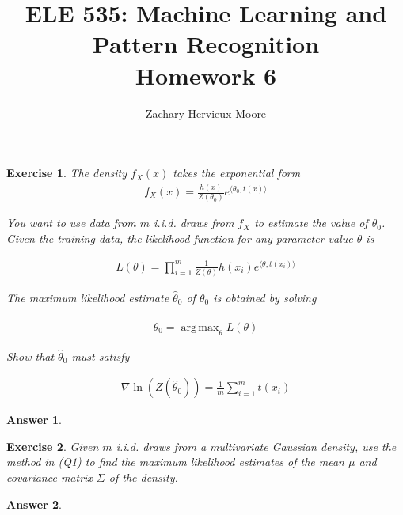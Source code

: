 \documentclass[12pt]{article}
\title{ELE 535: Machine Learning and Pattern Recognition \\ Homework 6}
\author{Zachary Hervieux-Moore}
\date{\displaydate{date}}
\DeclareMathOperator*{\argmax}{arg\,max}
\theoremstyle{colon}
\newtheorem{exercise}{Exercise}
\newtheorem*{answer}{Answer}
\begin{document}
\maketitle

\clearpage

\begin{exercise}
  The density $f_X(x)$ takes the exponential form
  \begin{gather*}
    f_X(x) = \frac{h(x)}{Z(\theta_0)} e^{\langle \theta_0, t(x) \rangle}
  \end{gather*}

  You want to use data from $m$ i.i.d. draws from $f_X$ to estimate the value of $\theta_0$. Given the training data, the likelihood function for any parameter value $\theta$ is

  \begin{gather*}
    L(\theta) = \prod_{i=1}^m \frac{1}{Z(\theta)} h(x_i) e^{\langle \theta, t(x_i) \rangle}
  \end{gather*}

  The maximum likelihood estimate $\hat{\theta}_0$ of $\theta_0$ is obtained by solving

  \begin{gather*}
    \hat{\theta}_0 = \argmax_\theta L(\theta)
  \end{gather*}

  Show that $\hat{\theta}_0$ must satisfy

  \begin{gather*}
    \nabla \ln (Z(\hat{\theta}_0)) = \frac{1}{m} \sum_{i=1}^m t(x_i)
  \end{gather*}
\end{exercise}

\begin{answer}

\end{answer}

\clearpage

\begin{exercise}
  Given $m$ i.i.d. draws from a multivariate Gaussian density, use the method in (Q1) to find the maximum likelihood estimates of the mean $\mu$ and covariance matrix $\Sigma$ of the density.
\end{exercise}

\begin{answer}

\end{answer}

\clearpage
\end{document}

